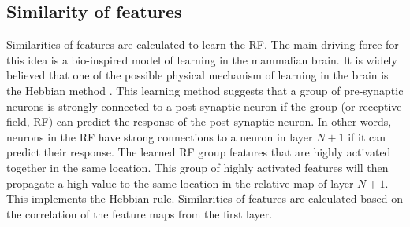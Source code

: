 \documentclass{article} %
\begin{document}




\subsection{Similarity of features}
\label{sec-similarity}
Similarities of features are calculated to learn the RF.
The main driving force for this idea is a bio-inspired model of learning in the mammalian brain.
It is widely believed that one of the possible physical mechanism of learning in the brain is the Hebbian method \cite{masquelier2007learning}.
This learning method suggests that a group of pre-synaptic neurons is strongly connected to a post-synaptic neuron if the group
(or receptive field, RF) can predict the response of the post-synaptic neuron.
In other words, neurons in the RF have strong connections to a neuron in layer $N+1$ if it can predict their response.
The learned RF group features that are highly activated together in the same location.
This group of highly activated features will then propagate a high value to the same location in the relative map of layer $N+1$.
This implements the Hebbian rule.
Similarities of features are calculated based on the correlation of the feature maps from the first layer. 



\end{document}
